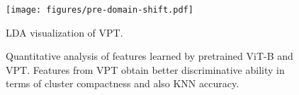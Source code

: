 \documentclass{article} \usepackage{iclr2023_conference,times}
\begin{document}
\begin{figure}[tp]
   \centering
   \begin{minipage}{0.46\textwidth}
\centering
            
      \texttt{[image: figures/pre-domain-shift.pdf]}
      \caption{LDA visualization of VPT.\vspace{-0.6em} } 
      \label{fig:pre_domain_shift}
   \end{minipage}
\hspace{3mm}
   \begin{minipage}{0.5\textwidth}
      \renewcommand\arraystretch{1.3}
\centering
      \captionsetup{type=table}
      \caption{Quantitative analysis of features learned by pretrained ViT-B and VPT. Features from VPT obtain better discriminative ability in terms of cluster compactness and also KNN accuracy.\vspace{-0.8em}}
\setlength{\tabcolsep}{6.6pt} \renewcommand{\arraystretch}{3.5}{ \fontsize{8.3}{3}}
      \label{table:pre_discriminative}
   \end{minipage}
   \vspace{-1.5em}
\end{figure}

\vspace{-0.3em}
\end{document}
